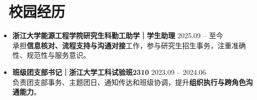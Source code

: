 \documentclass[11pt]{article}
\begin{document}
\section{\makebox[\widthof{\faGraduationCap}][c]{\color{CVBlue}\faList}\ 校园经历}
\begin{itemize}
    \item \textbf{浙江大学能源工程学院研究生科勤工助学｜学生助理} \hfill 2025.09 -- 至今\\
    承担\textbf{信息核对、流程支持与沟通对接}工作，参与研究生招生事务，注重准确性、规范性与服务意识。
    
    \item \textbf{班级团支部书记｜浙江大学工科试验班2310} \hfill 2023.09 -- 2024.06\\
    负责团支部事务、主题团日、通知传达和班级协调，提升\textbf{组织执行与跨角色沟通能力}。
    
\end{itemize}
\end{document}
